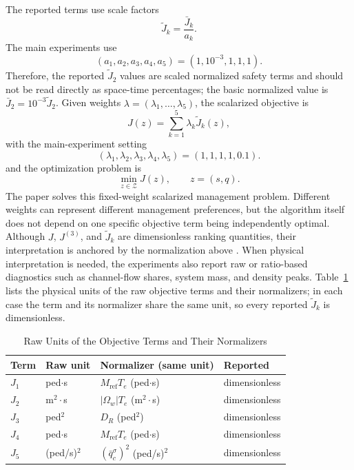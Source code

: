 \documentclass[lettersize,journal]{IEEEtran}
\begin{document}
The reported terms use scale factors
\begin{equation}
\tilde J_k=\frac{\bar J_k}{a_k}.
\label{eq:scaled_terms}
\end{equation}
The main experiments use
\[
(a_1,a_2,a_3,a_4,a_5)=(1,10^{-3},1,1,1).
\]
Therefore, the reported $\tilde J_2$ values are scaled normalized safety terms and should not be read directly as space-time percentages; the basic normalized value is $\bar J_2=10^{-3}\tilde J_2$.
Given weights $\lambda=(\lambda_1,\ldots,\lambda_5)$, the scalarized objective is
\begin{equation}
J(z) = \sum_{k=1}^{5}\lambda_k\tilde{J}_k(z),
\label{eq:scalarized}
\end{equation}
with the main-experiment setting
\[
(\lambda_1,\lambda_2,\lambda_3,\lambda_4,\lambda_5)=(1,1,1,1,0.1).
\]
and the optimization problem is
\begin{equation}
\min_{z \in \mathcal{Z}} J(z), \qquad z=(s,q).
\label{eq:optimization}
\end{equation}
The paper solves this fixed-weight scalarized management problem.
Different weights can represent different management preferences, but the algorithm itself does not depend on one specific objective term being independently optimal.
Although $J$, $J^{(3)}$, and $\tilde J_k$ are dimensionless ranking quantities, their interpretation is anchored by the normalization above \cite{RN2123,marler2004survey_moo_engineering}.
When physical interpretation is needed, the experiments also report raw or ratio-based diagnostics such as channel-flow shares, system mass, and density peaks.
Table~\ref{tab:objective_units} lists the physical units of the raw objective terms and their normalizers; in each case the term and its normalizer share the same unit, so every reported $\tilde J_k$ is dimensionless.

\begin{table}[!t]
\centering
\caption{Raw Units of the Objective Terms and Their Normalizers}
\label{tab:objective_units}
\footnotesize
\setlength{\tabcolsep}{5pt}
\begin{tabular}{l l l l}
\hline
Term & Raw unit & Normalizer (same unit) & Reported \\
\hline
$J_1$ & ped$\cdot$s & $M_{\mathrm{ref}}T_e$ (ped$\cdot$s) & dimensionless \\
$J_2$ & m$^2\cdot$s & $|\Omega_w|T_e$ (m$^2\cdot$s) & dimensionless \\
$J_3$ & ped$^2$ & $D_R$ (ped$^2$) & dimensionless \\
$J_4$ & ped$\cdot$s & $M_{\mathrm{ref}}T_e$ (ped$\cdot$s) & dimensionless \\
$J_5$ & (ped/s)$^2$ & $(\bar q_c^\sigma)^2$ (ped/s)$^2$ & dimensionless \\
\hline
\end{tabular}
\end{table}
\end{document}
